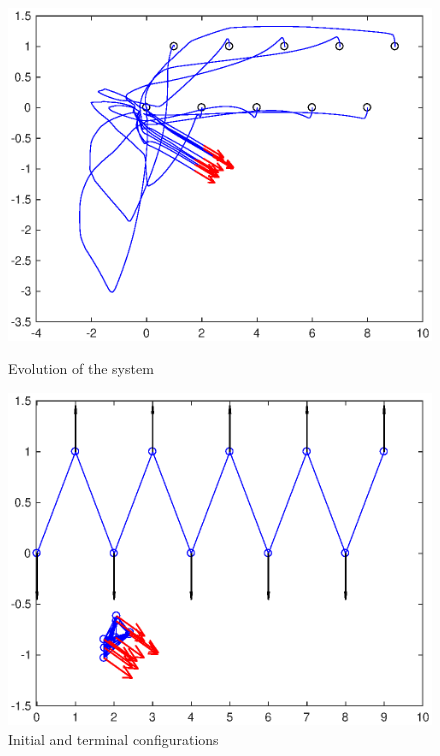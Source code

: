 \documentclass[a4paper,10pt, english]{article}
\begin{document}
\begin{figure}[ht]
  \begin{minipage}[b]{0.5\textwidth}
    \includegraphics[width=\textwidth]{figures/a10D_L+V_fine_mesh_NICE_ev.eps}
    \caption{Evolution of the system}
    \label{ev1}
  \end{minipage}
  \hfill
  \begin{minipage}[b]{0.5\textwidth}
    \includegraphics[width=\textwidth]{figures/a10D_L+V_fine_mesh_NICE_g.eps}
    \caption{Initial and terminal configurations}
    \label{g1}
  \end{minipage}
\end{figure}
\end{document}
